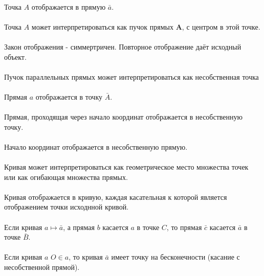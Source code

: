 \paragraph{} Точка $A$ отображается в прямую $\bar{a}$.
\paragraph{} Точка $A$ может интерпретироваться как пучок прямых $\mathbf{A}$, с центром в этой точке.
\paragraph{} Закон отображения - симмертричен. Повторное отображение даёт исходный объект.
\paragraph{} Пучок параллельных прямых может интерпретироваться как несобственная точка
\paragraph{} Прямая $a$ отображается в точку $\bar{A}$.
\paragraph{} Прямая, проходящая через начало координат отображается в несобственную точку.
\paragraph{} Начало координат отображается в несобственную прямую.
\paragraph{} Кривая может интерпретироваться как геометрическое место множества точек или как огибающая множества прямых.
\paragraph{} Кривая отображается в кривую, каждая касательная к которой является отображением точки исходнной кривой.
\paragraph{} Если кривая $a \mapsto \bar{a}$, а прямая $b$ касается $a$ в точке $C$, то прямая $\bar{c}$ касается $\bar{a}$ в точке $\bar{B}$.
\paragraph{} Если кривая $a$ $O \in a$, то кривая $\bar{a}$ имеет точку на бесконечности (касание с несобственной прямой).